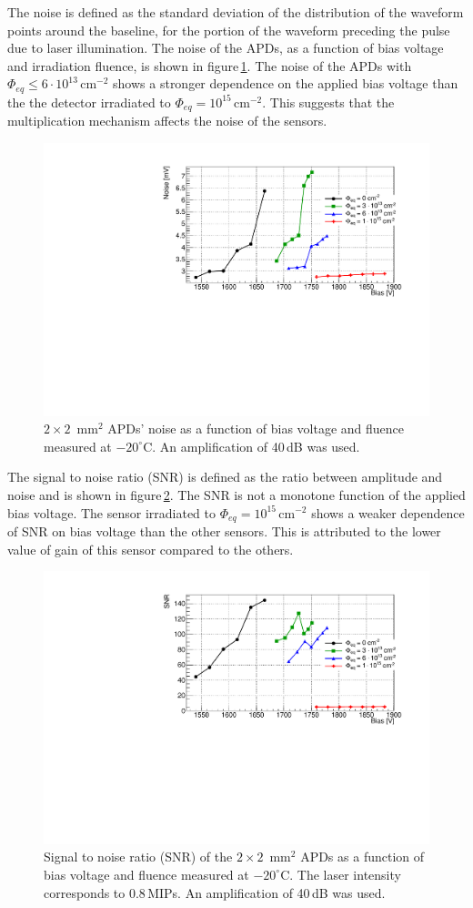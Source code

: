 \documentclass{article}
\begin{document}
The noise is defined as the standard deviation of the distribution of the waveform points around the baseline, for the portion of the waveform preceding the pulse due to laser illumination.
The noise of the APDs, as a function of bias voltage and irradiation fluence, is shown in figure\,\ref{fig:noise2x2}.
The noise of the APDs with $\Phi_{eq} \leq 6 \cdot 10^{13}$\,cm$^{-2}$ shows a stronger dependence on the applied bias voltage than the the detector irradiated to $\Phi_{eq} = 10^{15}$\,cm$^{-2}$.
This suggests that the multiplication mechanism affects the noise of the sensors.

\begin{figure}
  \centering
  \includegraphics[width = 0.6 \textwidth]{noise2x2APDs}
  \caption{$2 \times 2$~mm$^2$ APDs' noise as a function of bias voltage and fluence measured at $-20^\circ$C. An amplification of 40\,dB was used.}
  \label{fig:noise2x2}
\end{figure}

The signal to noise ratio (SNR) is defined as the ratio between amplitude and noise and is shown in figure\,\ref{fig:snr2x2}.
The SNR is not a monotone function of the applied bias voltage.
The sensor irradiated to $\Phi_{eq} = 10^{15}$\,cm$^{-2}$ shows a weaker dependence of SNR on bias voltage than the other sensors.
This is attributed to the lower value of gain of this sensor compared to the others.

\begin{figure}
  \centering
  \includegraphics[width = 0.6 \textwidth]{snr2x2APDs}
  \caption{Signal to noise ratio (SNR) of the $2 \times 2$~mm$^2$ APDs as a function of bias voltage and fluence measured at $-20^\circ$C. The laser intensity corresponds to 0.8\,MIPs. An amplification of 40\,dB was used.}
  \label{fig:snr2x2}
\end{figure}
\end{document}
